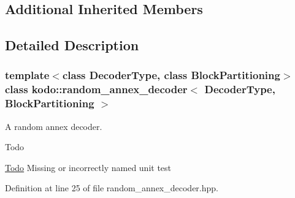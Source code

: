 \subsection*{Additional Inherited Members}


\subsection{Detailed Description}
\subsubsection*{template$<$class Decoder\-Type, class Block\-Partitioning$>$class kodo\-::random\-\_\-annex\-\_\-decoder$<$ Decoder\-Type, Block\-Partitioning $>$}

A random annex decoder. 

\begin{DoxyRefDesc}{Todo}
\item[\hyperlink{todo__todo000039}{Todo}]Missing or incorrectly named unit test \end{DoxyRefDesc}


Definition at line 25 of file random\-\_\-annex\-\_\-decoder.\-hpp.



